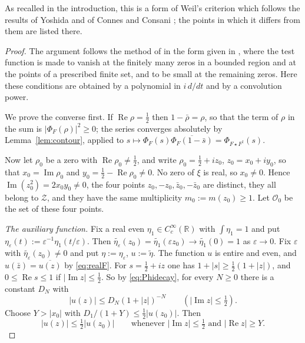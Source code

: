 \documentclass[11pt]{amsart}
\theoremstyle{remark}
\numberwithin{equation}{section}
\newcommand{\R}{\mathbb R}
\newcommand{\Rel}{\operatorname{Re}}
\newcommand{\Iml}{\operatorname{Im}}
\begin{document}
As recalled in the introduction, this is a form of Weil's criterion
\cite{Weil1952} which follows the results of Yoshida \cite{Yoshida} and of
Connes and Consani \cite[Proposition~C.1]{CCWeilArch}; the points in which
it differs from them are listed there.

\begin{proof}
The argument follows the method of \cite[Lemma~1 and Proposition~1]{Yoshida}
in the form given in \cite[Appendix~C]{CCWeilArch}, where the test function
is made to vanish at the finitely many zeros in a bounded region and at the
points of a prescribed finite set, and to be small at the remaining zeros.
Here these conditions are obtained by a polynomial in $i\,d/dt$ and by a
convolution power.

We prove the converse first.  If $\Rel\rho=\tfrac12$ then $1-\bar\rho=\rho$,
so that the term of $\rho$ in the sum is $|\Phi_F(\rho)|^2\ge0$; the series
converges absolutely by Lemma~\ref{lem:contour}, applied to
$s\mapsto\Phi_F(s)\overline{\Phi_F(1-\bar s)}=\Phi_{F\star F^\dagger}(s)$.

Now let $\rho_0$ be a zero with $\Rel\rho_0\ne\tfrac12$, and write
$\rho_0=\tfrac12+iz_0$, $z_0=x_0+iy_0$, so that $x_0=\Iml\rho_0$ and
$y_0=\tfrac12-\Rel\rho_0\ne0$.  No zero of $\xi$ is real, so $x_0\ne0$.
Hence $\Iml(z_0^2)=2x_0y_0\ne0$, the four points
$z_0,-z_0,\bar z_0,-\bar z_0$ are distinct, they all belong to $\mathcal Z$,
and they have the same multiplicity $m_0:=m(z_0)\ge1$.  Let $\mathcal O_0$
be the set of these four points.

\emph{The auxiliary function.}  Fix a real even $\eta_1\in C_c^\infty(\R)$
with $\int\eta_1=1$ and put $\eta_\varepsilon(t):=\varepsilon^{-1}
\eta_1(t/\varepsilon)$.  Then $\widetilde{\eta_\varepsilon}(z_0)
=\widetilde{\eta_1}(\varepsilon z_0)\to\widetilde{\eta_1}(0)=1$ as
$\varepsilon\to0$.  Fix $\varepsilon$ with
$\widetilde{\eta_\varepsilon}(z_0)\ne0$ and put $\eta:=\eta_\varepsilon$,
$u:=\widetilde\eta$.  The function $u$ is entire and even, and
$u(\bar z)=\overline{u(z)}$ by \eqref{eq:realF}.  For $s=\tfrac12+iz$ one
has $1+|s|\ge\tfrac12(1+|z|)$, and $0\le\Rel s\le1$ if
$|\Iml z|\le\tfrac12$.  So by \eqref{eq:Phidecay}, for
every $N\ge0$ there is a constant $D_N$ with
\begin{equation}
\label{eq:udecay}
  |u(z)|\le D_N(1+|z|)^{-N}\qquad(|\Iml z|\le\tfrac12).
\end{equation}
Choose $Y>|x_0|$ with $D_1/(1+Y)\le\tfrac12|u(z_0)|$.  Then
\begin{equation}
\label{eq:half}
  |u(z)|\le\tfrac12|u(z_0)|\qquad
  \text{whenever }|\Iml z|\le\tfrac12\text{ and }|\Rel z|\ge Y.
\end{equation}


\end{proof}
\end{document}
